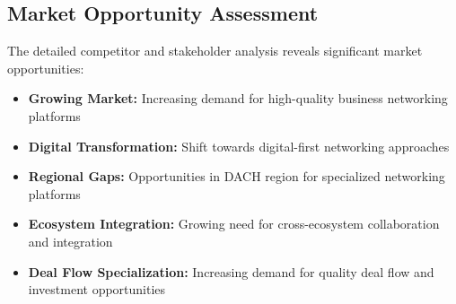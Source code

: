 \subsection{Market Opportunity Assessment}
The detailed competitor and stakeholder analysis reveals significant market opportunities:
\begin{itemize}
    \item \textbf{Growing Market:} Increasing demand for high-quality business networking platforms
    \item \textbf{Digital Transformation:} Shift towards digital-first networking approaches
    \item \textbf{Regional Gaps:} Opportunities in DACH region for specialized networking platforms
    \item \textbf{Ecosystem Integration:} Growing need for cross-ecosystem collaboration and integration
    \item \textbf{Deal Flow Specialization:} Increasing demand for quality deal flow and investment opportunities
\end{itemize} 